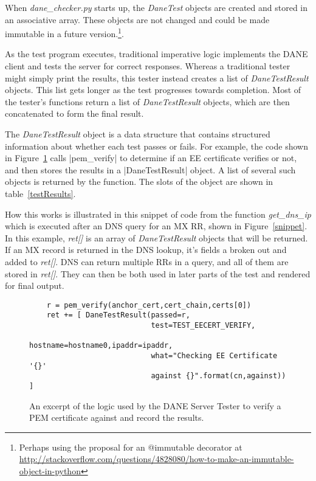 \documentclass[preprint,3p,11pt]{elsarticle}
\begin{document}
When \emph{dane\_checker.py} starts up, the \emph{DaneTest} objects are created
and stored in an associative array. These objects are not changed and
could be made immutable in a future version.\footnote{Perhaps using
  the proposal for an @immutable decorator at \url{http://stackoverflow.com/questions/4828080/how-to-make-an-immutable-object-in-python}}.

As the test program executes, traditional imperative logic implements
the DANE client and tests the server for correct responses. Whereas a
traditional tester might simply print the results, this tester instead
creates a list of \emph{DaneTestResult} objects. This list gets longer
as the test progresses towards completion. Most of the tester's
functions return a list of \emph{DaneTestResult} objects, which are
then concatenated to form the final result.

The \emph{DaneTestResult} object is a data structure that contains
structured information about whether each test passes or fails. For
example, the code shown in Figure~\ref{pem-snippet} calls |pem_verify|
to determine if an EE certificate verifies or not, and then stores the
results in a |DaneTestResult| object. A list of several such objects
is returned by the function. The slots of the object are shown in table~\ref{testResults}.



How this works is illustrated in this snippet of code from the
function \emph{get\_dns\_ip} which is executed after an DNS query for
an MX RR, shown in Figure~\ref{snippet}. In this example, \emph{ret[]} is an array of \emph{DaneTestResult}
objects that will be returned. If an MX record is returned in the DNS
lookup, it's fields a broken out and added to \emph{ret[]}. DNS can
return multiple RRs in a query, and all of them are stored in
\emph{ret[]}.  They can then be both used in later parts of the test
and rendered for final output.


\begin{figure}
\begin{lstlisting}
    r = pem_verify(anchor_cert,cert_chain,certs[0])
    ret += [ DaneTestResult(passed=r,
                            test=TEST_EECERT_VERIFY,
                            hostname=hostname0,ipaddr=ipaddr,
                            what="Checking EE Certificate '{}'
                            against {}".format(cn,against)) ]

\end{lstlisting}
\caption{An excerpt of the logic used by the DANE Server Tester to
  verify a PEM certificate against and record the results.}\label{pem-snippet}
\end{figure}
\end{document}

